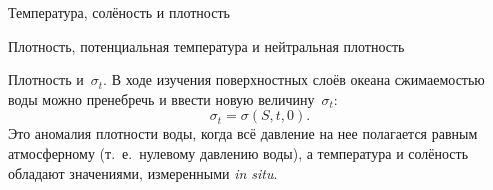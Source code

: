 \begin{chapter}{Температура, солёность и плотность}
\begin{section}{Плотность, потенциальная температура и нейтральная плотность}
\begin{paragraph}{Плотность и~$\sigma_t$.}
В ходе изучения поверхностных слоёв океана сжимаемостью воды можно пренебречь
и ввести новую величину~$\sigma_t$:
\begin{equation}\label{eq:6.8}
\sigma_t = \sigma(S,t,0). 
\end{equation}
Это аномалия плотности воды, когда всё давление на нее полагается равным
атмосферному (т.~е.\ нулевому давлению воды), а температура и солёность 
обладают значениями, измеренными \emph{in situ}.
%


\end{paragraph}
\end{section}
\end{chapter}
